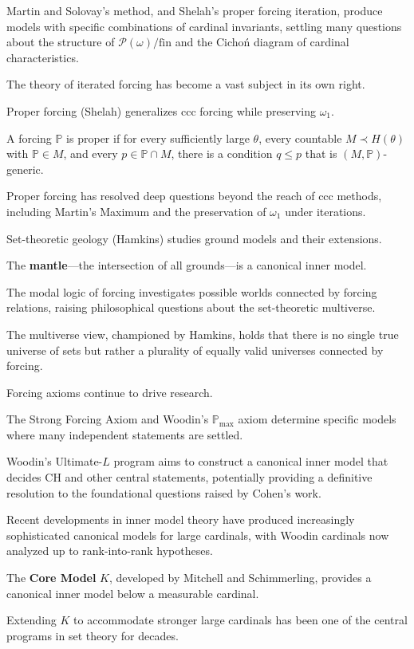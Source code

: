 Martin and Solovay's method, and Shelah's proper forcing iteration, produce models with specific combinations of cardinal invariants, settling many questions about the structure of $\mathcal{P}(\omega)/\text{fin}$ and the Cichoń diagram of cardinal characteristics.

The theory of iterated forcing has become a vast subject in its own right.

Proper forcing (Shelah) generalizes ccc forcing while preserving $\omega_1$.

A forcing $\mathbb{P}$ is proper if for every sufficiently large $\theta$, every countable $M \prec H(\theta)$ with $\mathbb{P} \in M$, and every $p \in \mathbb{P} \cap M$, there is a condition $q \leq p$ that is $(M, \mathbb{P})$-generic.

Proper forcing has resolved deep questions beyond the reach of ccc methods, including Martin's Maximum and the preservation of $\omega_1$ under iterations.

Set-theoretic geology (Hamkins) studies ground models and their extensions.

The \textbf{mantle}---the intersection of all grounds---is a canonical inner model.

The modal logic of forcing investigates possible worlds connected by forcing relations, raising philosophical questions about the set-theoretic multiverse.

The multiverse view, championed by Hamkins, holds that there is no single true universe of sets but rather a plurality of equally valid universes connected by forcing.

Forcing axioms continue to drive research.

The Strong Forcing Axiom and Woodin's $\mathbb{P}_{\max}$ axiom determine specific models where many independent statements are settled.

Woodin's Ultimate-$L$ program aims to construct a canonical inner model that decides CH and other central statements, potentially providing a definitive resolution to the foundational questions raised by Cohen's work.

Recent developments in inner model theory have produced increasingly sophisticated canonical models for large cardinals, with Woodin cardinals now analyzed up to rank-into-rank hypotheses.

The \textbf{Core Model} $K$, developed by Mitchell and Schimmerling, provides a canonical inner model below a measurable cardinal.

Extending $K$ to accommodate stronger large cardinals has been one of the central programs in set theory for decades.

